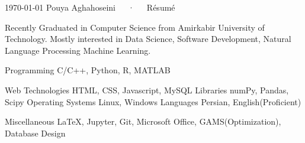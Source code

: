 \documentclass[11pt, a4paper]{awesome-cv}
\begin{document}
\makecvheader[C]

\makecvfooter
  {\today}
  {Pouya Aghahoseini~~~·~~~Résumé}
  {\thepage}


\begin{cvparagraph}
	
	Recently Graduated in Computer Science from Amirkabir University of Technology.
	Mostly interested in Data Science, Software Development, Natural Language Processing Machine Learning.
	
\end{cvparagraph}


\begin{cvskills}
	\cvskill
	{Programming} %
	{C/C++, Python, R, MATLAB} %
	
	\cvskill
	{Web Technologies} %
	{HTML, CSS, Javascript, MySQL} %
	\cvskill
	{Libraries} %
	{numPy, Pandas, Scipy} %
	\cvskill
	{Operating Systems} %
	{Linux, Windows}
	\cvskill
	{Languages} %
	{Persian, English(Proficient)}	
	
	\cvskill
	{Miscellaneous}
	{\LaTeX, Jupyter, Git, Microsoft Office, GAMS(Optimization), Database Design}%
	
\end{cvskills}
\end{document}

